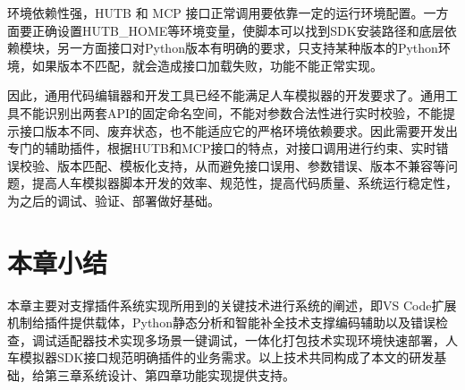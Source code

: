 环境依赖性强，HUTB 和 MCP
接口正常调用要依靠一定的运行环境配置。一方面要正确设置HUTB\_HOME等环境变量，使脚本可以找到SDK安装路径和底层依赖模块，另一方面接口对Python版本有明确的要求，只支持某种版本的Python环境，如果版本不匹配，就会造成接口加载失败，功能不能正常实现。

因此，通用代码编辑器和开发工具已经不能满足人车模拟器的开发要求了。通用工具不能识别出两套API的固定命名空间，不能对参数合法性进行实时校验，不能提示接口版本不同、废弃状态，也不能适应它的严格环境依赖要求。因此需要开发出专门的辅助插件，根据HUTB和MCP接口的特点，对接口调用进行约束、实时错误校验、版本匹配、模板化支持，从而避免接口误用、参数错误、版本不兼容等问题，提高人车模拟器脚本开发的效率、规范性，提高代码质量、系统运行稳定性，为之后的调试、验证、部署做好基础。

\section{本章小结}

本章主要对支撑插件系统实现所用到的关键技术进行系统的阐述，即VS
Code扩展机制给插件提供载体，Python静态分析和智能补全技术支撑编码辅助以及错误检查，调试适配器技术实现多场景一键调试，一体化打包技术实现环境快速部署，人车模拟器SDK接口规范明确插件的业务需求。以上技术共同构成了本文的研发基础，给第三章系统设计、第四章功能实现提供支持。
